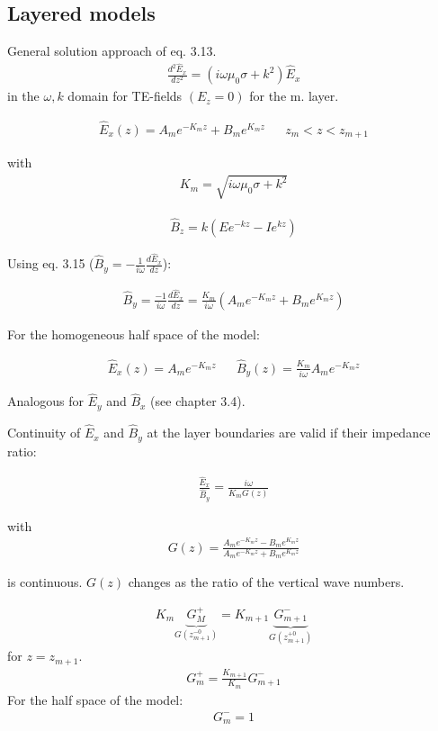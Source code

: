 \subsection{Layered models}
General solution approach of eq. 3.13.
\begin{align*}
\frac{d^2\hat{E}_x}{dz^2}=(i\omega\mu_0\sigma+k^2)\hat{E}_x
\end{align*}
in the $\omega,k$ domain for TE-fields $(E_z=0)$ for the m. layer.

\begin{align*}
\hat{E}_x(z)=A_me^{-K_m z}+B_me^{K_m z}&& z_m<z<z_{m+1}
\end{align*}

with 
\begin{align}
K_m=\sqrt{i\omega\mu_0\sigma+k^2}
\end{align}

\begin{align*}
\hat{B}_z=k(Ee^{-kz}-Ie^{kz})
\end{align*}


Using eq. 3.15 ($\hat{B}_y=-\frac{1}{i\omega}\frac{d\hat{E}_x}{dz}$):

\begin{align}
\hat{B}_y=\frac{-1}{i\omega}\frac{d\hat{E}_x}{dz}=\frac{K_m}{i\omega}(A_me^{-K_m z}+B_me^{K_m z})
\end{align}

For the homogeneous half space of the model:

\begin{align*}
\hat{E}_x(z)=A_me^{-K_m z} && \hat{B}_y(z)=\frac{K_m}{i\omega}A_m e^{-K_m z}
\end{align*}

Analogous for $\hat{E}_y$ and $\hat{B}_x$ (see chapter 3.4).

Continuity of $\hat{E}_x$ and $\hat{B}_y$ at the layer boundaries are valid if their impedance ratio:

\begin{align}
\frac{\hat{E}_x}{\hat{B}_y}=\frac{i\omega}{K_mG(z)}
\end{align}

with 
\begin{align}
G(z)=\frac{A_me^{-K_m z}-B_me^{K_m z}}{A_me^{-K_m z}+B_me^{K_m z}}
\end{align}

is continuous. $G(z)$ changes as the ratio of the vertical wave numbers.

\begin{align*}
K_m \underbrace{G_M^+}_{G(z_{m+1}^{-0})}=K_{m+1}\underbrace{G_{m+1}^-}_{G(z_{m+1}^{+0})}
\end{align*}
for $z=z_{m+1}$.
\begin{align*}
G_m^+=\frac{K_{m+1}}{K_m}G_{m+1}^-
\end{align*}
For the half space of the model:
\begin{align*}
G_{m}^-=1
\end{align*} 

